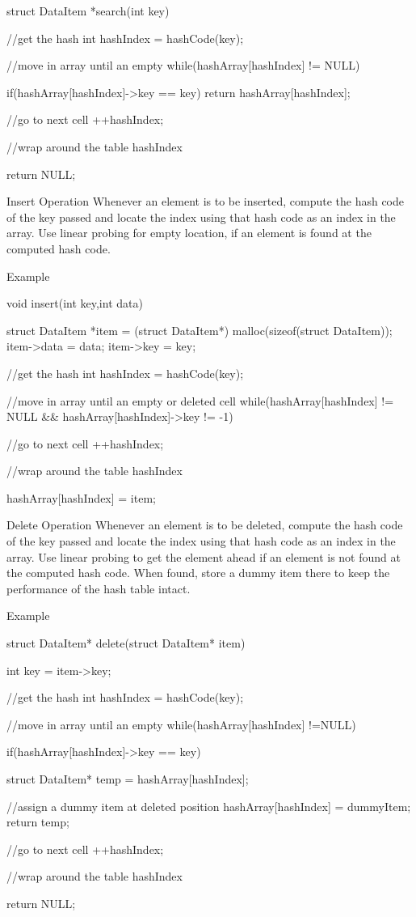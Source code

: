 struct DataItem *search(int key) {
   //get the hash
   int hashIndex = hashCode(key);

   //move in array until an empty
   while(hashArray[hashIndex] != NULL) {

      if(hashArray[hashIndex]->key == key)
         return hashArray[hashIndex];

      //go to next cell
      ++hashIndex;

      //wrap around the table
      hashIndex %
   }

   return NULL;
}
Insert Operation
Whenever an element is to be inserted, compute the hash code of the key passed and locate the index using that hash code as an index in the array. Use linear probing for empty location, if an element is found at the computed hash code.

Example

void insert(int key,int data) {
   struct DataItem *item = (struct DataItem*) malloc(sizeof(struct DataItem));
   item->data = data;
   item->key = key;

   //get the hash
   int hashIndex = hashCode(key);

   //move in array until an empty or deleted cell
   while(hashArray[hashIndex] != NULL && hashArray[hashIndex]->key != -1) {
      //go to next cell
      ++hashIndex;

      //wrap around the table
      hashIndex %
   }

   hashArray[hashIndex] = item;
}
Delete Operation
Whenever an element is to be deleted, compute the hash code of the key passed and locate the index using that hash code as an index in the array. Use linear probing to get the element ahead if an element is not found at the computed hash code. When found, store a dummy item there to keep the performance of the hash table intact.

Example

struct DataItem* delete(struct DataItem* item) {
   int key = item->key;

   //get the hash
   int hashIndex = hashCode(key);

   //move in array until an empty
   while(hashArray[hashIndex] !=NULL) {

      if(hashArray[hashIndex]->key == key) {
         struct DataItem* temp = hashArray[hashIndex];

         //assign a dummy item at deleted position
         hashArray[hashIndex] = dummyItem;
         return temp;
      }

      //go to next cell
      ++hashIndex;

      //wrap around the table
      hashIndex %
   }

   return NULL;
}

